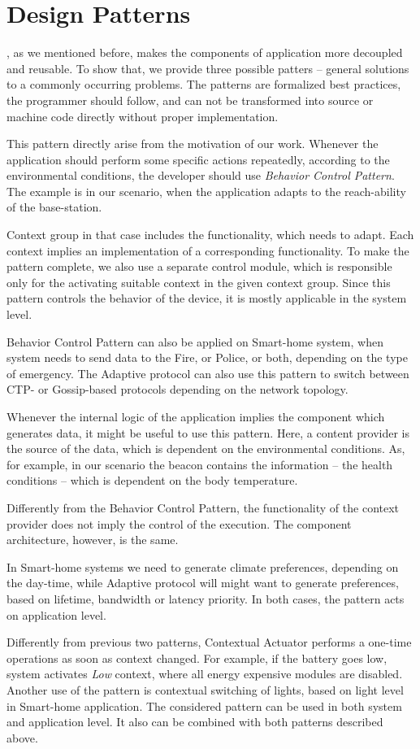 \section{Design Patterns}
\label{sec:patterns}

\conesc, as we mentioned before, makes the components of application more
decoupled and reusable. To show that, we provide three possible patters --
general solutions to a commonly occurring problems. The patterns are formalized
best practices, the programmer should follow, and can not be transformed into
source or machine code directly without proper implementation.

This pattern directly arise from the
motivation of our work. Whenever the application should perform some specific
actions repeatedly, according to the environmental conditions, the developer
should use \emph{Behavior Control Pattern}. The example is in our scenario, when
the application adapts to the reach-ability of the base-station.

Context group in that case includes the functionality, which needs to adapt.
Each context implies an implementation of a corresponding functionality. To make
the pattern complete, we also use a separate control module, which is
responsible only for the activating suitable context in the given context group. Since this pattern controls the behavior of the device, it is mostly applicable in the system level.

Behavior Control Pattern can also be applied on Smart-home system, when system
needs to send data to the Fire, or Police, or both, depending on the type of
emergency. The Adaptive protocol can also use this pattern to switch between
CTP- or Gossip-based protocols depending on the network topology.

Whenever the internal logic of the
application implies the component which generates data, it might be useful to
use this pattern. Here, a content provider is the source of the data, which is
dependent on the environmental conditions. As, for example, in our scenario the
beacon contains the information -- the health conditions -- which is dependent
on the body temperature.

Differently from the Behavior Control Pattern, the functionality of the context
provider does not imply the control of the execution. The component
architecture, however, is the same.

In Smart-home systems we need to generate climate preferences, depending on the
day-time, while Adaptive protocol will might want to generate preferences, based
on lifetime, bandwidth or latency priority. In both cases, the pattern acts on
application level.

 Differently from previous two patterns,
Contextual Actuator performs a one-time operations as soon as context changed.
For example, if the battery goes low, system activates \emph{Low} context, where
all energy expensive modules are disabled. Another use of the pattern is
contextual switching of lights, based on light level in Smart-home application.
The considered pattern can be used in both system and application level. It also
can be combined with both patterns described above.
